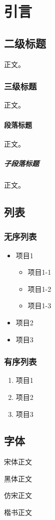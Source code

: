 \section{引言}\label{sec:introduction}

\subsection{二级标题}

正文。

\subsubsection{三级标题}

正文。

\paragraph{段落标题}

正文。

\subparagraph{子段落标题}

正文。

\subsection{列表}

\subsubsection{无序列表}

\begin{itemize}
    \item 项目1
          \begin{itemize}
              \item 项目1-1
              \item 项目1-2
              \item 项目1-3
          \end{itemize}
    \item 项目2
    \item 项目3
\end{itemize}

\subsubsection{有序列表}

\begin{enumerate}
    \item 项目1
    \item 项目2
    \item 项目3
\end{enumerate}

\subsection{字体}

{\songti 宋体正文}

{\heiti 黑体正文}

{\fangsong 仿宋正文}

{\kaishu 楷书正文}